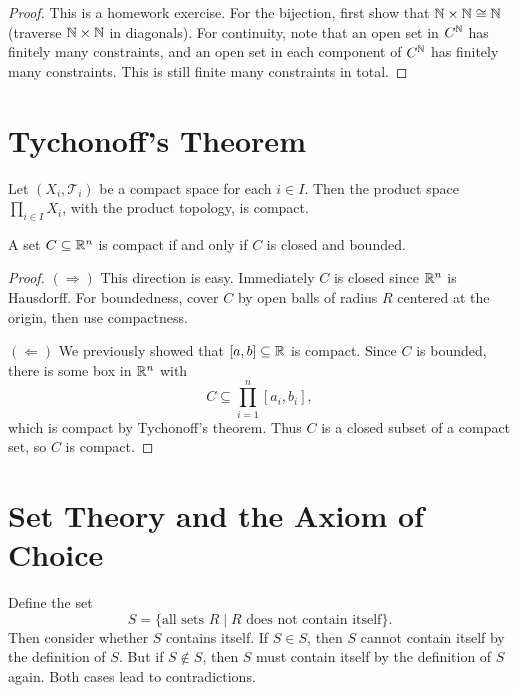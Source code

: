 \begin{proof}
  This is a homework exercise. For the bijection,
  first show that
  $\mathbb{N} \times \mathbb{N} \cong \mathbb{N}$ (traverse $\mathbb{N} \times \mathbb{N}$
  in diagonals). For continuity, note that an open set
  in $C^{\mathbb{N}}$ has finitely many constraints, and an
  open set in each component of $C^{\mathbb{N}}$ has finitely
  many constraints. This is still finite many
  constraints in total.
\end{proof}

\section{Tychonoff's Theorem}

\begin{theorem}[Tychonoff]
  Let $(X_i, \mathcal{T}_i)$ be a compact space
  for each $i \in I$. Then the product space
  $\prod_{i \in I} X_i$, with the product
  topology, is compact.
\end{theorem}

\begin{corollary}
  A set $C \subseteq \mathbb{R}^n$ is compact if and only
  if $C$ is closed and bounded.
\end{corollary}

\begin{proof}
  $(\Rightarrow)$ This direction is easy. Immediately
  $C$ is closed since $\mathbb{R}^n$ is Hausdorff. For
  boundedness, cover $C$ by open balls of radius $R$
  centered at the origin, then use compactness.

  $(\Leftarrow)$ We previously showed that
  $[a, b] \subseteq \mathbb{R}$ is compact. Since $C$ is
  bounded, there is some box in $\mathbb{R}^n$ with
  \[
    C \subseteq \prod_{i=1}^n [a_i, b_i],
  \]
  which is compact by Tychonoff's theorem. Thus
  $C$ is a closed subset of a compact set, so $C$ is
  compact.
\end{proof}

\section{Set Theory and the Axiom of Choice}

\begin{example}
  Define the set
  \[
    S = \{\text{all sets $R$} \mid \text{$R$ does not contain itself}\}.
  \]
  Then consider whether $S$ contains itself.
  If $S \in S$, then $S$ cannot contain itself by
  the definition of $S$. But
  if $S \notin S$, then $S$ must contain itself
  by the definition of $S$ again. Both
  cases lead to contradictions.
\end{example}

